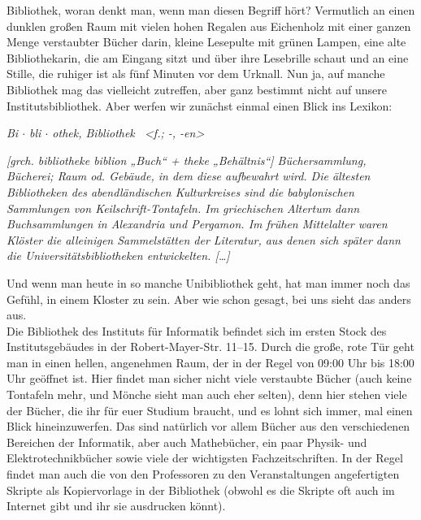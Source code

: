 Bibliothek, woran denkt man, wenn man diesen Begriff hört? Vermutlich an einen dunklen großen Raum mit vielen hohen Regalen aus Eichenholz mit einer ganzen Menge verstaubter Bücher darin, kleine Lesepulte mit grünen Lampen, eine alte Bibliothekarin, die am Eingang sitzt und über ihre Lesebrille schaut und an eine Stille, die ruhiger ist als fünf Minuten vor dem Urknall. Nun ja, auf manche Bibliothek mag das vielleicht zutreffen, aber ganz bestimmt nicht auf unsere Institutsbibliothek. Aber werfen wir zunächst einmal einen Blick ins Lexikon:\\

\begin{flushright}
\textit{Bi $\cdot$ bli $\cdot$ o\textasciiacute thek, Bi\textbar bli\textbar o\textbar thek~ \textless f.; -, -en\textgreater}

\textit{[grch. bibliotheke biblion „Buch“ + theke „Behältnis“] Büchersammlung, Bücherei; Raum od. Gebäude, in dem diese aufbewahrt wird. Die ältesten Bibliotheken des abendländischen Kulturkreises sind die babylonischen Sammlungen von Keilschrift-Tontafeln. Im griechischen Altertum dann Buchsammlungen in Alexandria und Pergamon. Im frühen Mittelalter waren Klöster die alleinigen Sammelstätten der Literatur, aus denen sich später dann die Universitätsbibliotheken entwickelten. [\dots]}
\end{flushright}

Und wenn man heute in so manche Unibibliothek geht, hat man immer noch das Gefühl, in einem Kloster zu sein. Aber wie schon gesagt, bei uns sieht das anders aus.\\

Die Bibliothek des Instituts für Informatik befindet sich im ersten Stock des Institutsgebäudes in der Robert-Mayer-Str. 11–15. Durch die große, rote Tür geht man in einen hellen, angenehmen Raum, der in der Regel von 09:00 Uhr bis 18:00 Uhr geöffnet ist. Hier findet man sicher nicht viele verstaubte Bücher (auch keine Tontafeln mehr, und Mönche sieht man auch eher selten), denn hier stehen viele der Bücher, die ihr für euer Studium braucht, und es lohnt sich immer, mal einen Blick hineinzuwerfen. Das sind natürlich vor allem Bücher aus den verschiedenen Bereichen der Informatik, aber auch Mathebücher, ein paar Physik- und Elektrotechnikbücher sowie viele der wichtigsten Fachzeitschriften. In der Regel findet man auch die von den Professoren zu den Veranstaltungen angefertigten Skripte als Kopiervorlage in der Bibliothek (obwohl es die Skripte oft auch im Internet gibt und ihr sie ausdrucken könnt).\\

